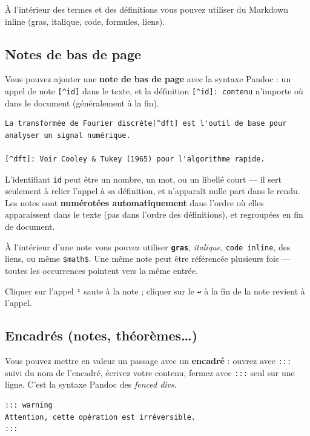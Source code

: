 \documentclass[11pt,a4paper]{article}
\theoremstyle{definition}
\begin{document}
À l'intérieur des termes et des définitions vous pouvez utiliser du
Markdown inline (gras, italique, code, formules, liens).


\subsection{Notes de bas de page}

Vous pouvez ajouter une \textbf{note de bas de page} avec la syntaxe
Pandoc : un appel de note \texttt{[\textasciicircum{}id]} dans le texte, et la définition
\texttt{[\textasciicircum{}id]: contenu} n'importe où dans le document (généralement à la
fin).


\begin{lstlisting}
La transformée de Fourier discrète[^dft] est l'outil de base pour
analyser un signal numérique.

[^dft]: Voir Cooley & Tukey (1965) pour l'algorithme rapide.
\end{lstlisting}


L'identifiant \texttt{id} peut être un nombre, un mot, ou un libellé court —
il sert seulement à relier l'appel à sa définition, et n'apparaît
nulle part dans le rendu. Les notes sont \textbf{numérotées
automatiquement} dans l'ordre où elles apparaissent dans le texte
(pas dans l'ordre des définitions), et regroupées en fin de document.


À l'intérieur d'une note vous pouvez utiliser \textbf{\texttt{gras}}, \emph{italique},
\texttt{code inline}, des liens, ou même \texttt{\$math\$}. Une même note peut être
référencée plusieurs fois — toutes les occurrences pointent vers la
même entrée.


Cliquer sur l'appel \texttt{¹} saute à la note ; cliquer sur le \texttt{↩} à la
fin de la note revient à l'appel.


\subsection{Encadrés (notes, théorèmes…)}

Vous pouvez mettre en valeur un passage avec un \textbf{encadré} : ouvrez
avec \texttt{:::} suivi du nom de l'encadré, écrivez votre contenu, fermez
avec \texttt{:::} seul sur une ligne. C'est la syntaxe Pandoc des \emph{fenced
divs}.


\begin{lstlisting}
::: warning
Attention, cette opération est irréversible.
:::
\end{lstlisting}
\end{document}
